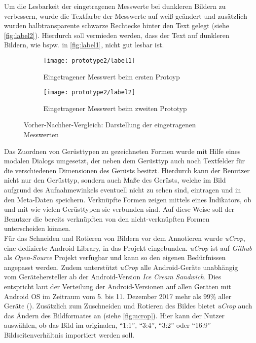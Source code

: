 Um die Lesbarkeit der eingetragenen Messwerte bei dunkleren Bildern zu verbessern, wurde die Textfarbe der Messwerte auf weiß geändert und zusätzlich wurden halbtransparente schwarze Rechtecke hinter den Text gelegt (siehe \autoref{fig:label2}).
Hierdurch soll vermieden werden, dass der Text auf dunkleren Bildern, wie bspw. in \autoref{fig:label1}, nicht gut lesbar ist.
\begin{figure}[h]
  \centering
  \begin{subfigure}[t]{0.4\textwidth}
    \texttt{[image: prototype2/label1]}
    \caption{Eingetragener Messwert beim ersten Protoyp}
    \label{fig:label1}
  \end{subfigure}
  \begin{subfigure}[t]{0.4\textwidth}
    \texttt{[image: prototype2/label2]}
    \caption{Eingetragener Messwert beim zweiten Prototyp}
    \label{fig:label2}
  \end{subfigure}
  \caption{Vorher-Nachher-Vergleich: Darstellung der eingetragenen Messwerten}
  \label{fig:labels}
\end{figure}

Das Zuordnen von Gerüsttypen zu gezeichneten Formen wurde mit Hilfe eines modalen Dialogs umgesetzt, der neben dem Gerüsttyp auch noch Textfelder für die verschiedenen Dimensionen des Gerüsts besitzt.
Hierdurch kann der Benutzer nicht nur den Gerüsttyp, sondern auch Maße des Gerüsts, welche im Bild aufgrund des Aufnahmewinkels eventuell nicht zu sehen sind, eintragen und in den Meta-Daten speichern.
Verknüpfte Formen zeigen mittels eines Indikators, ob und mit wie vielen Gerüsttypen sie verbunden sind.
Auf diese Weise soll der Benutzer die bereits verknüpften von den nicht-verknüpften Formen unterscheiden können. \\

Für das Schneiden und Rotieren von Bildern vor dem Annotieren wurde \emph{uCrop}, eine dedizierte Android-Library, in das Projekt eingebunden.
\emph{uCrop} ist auf \emph{Github} als \emph{Open-Source} Projekt verfügbar und kann so den eigenen Bedürfnissen angepasst werden. 
Zudem unterstützt \emph{uCrop} alle Android-Geräte unabhängig vom Gerätehersteller ab der Android-Version \emph{Ice Cream Sandwich}. 
Dies entspricht laut der Verteilung der Android-Versionen auf allen Geräten mit Android OS im Zeitraum vom 5. bis 11. Dezember 2017 mehr als $99\%$ aller Geräte ().
Zusätzlich zum Zuschneiden und Rotieren des Bildes bietet \emph{uCrop} auch das Ändern des Bildformates an (siehe \autoref{fig:ucrop}).
Hier kann der Nutzer auswählen, ob das Bild im originalen, ``1:1'', ``3:4'', ``3:2'' oder ``16:9'' Bildseitenverhältnis importiert werden soll.

